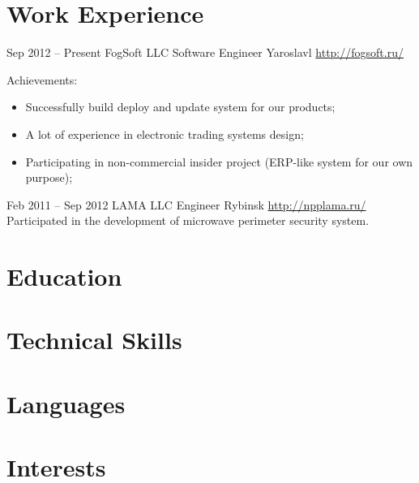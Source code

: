 \documentclass[11pt,a4paper,sans]{moderncv}
\begin{document}
    \makecvtitle
    
    \section{Work Experience}
    \cventry
      {Sep 2012 -- Present}
      {FogSoft LLC}
      {Software Engineer}
      {Yaroslavl}
      {\newline{}\url{http://fogsoft.ru/}}
      {Achievements:%
    \begin{itemize}%
    \item Successfully build deploy and update system for our products;
    \item A lot of experience in electronic trading systems design;
    \item Participating in non-commercial insider project (ERP-like system for our own purpose);
    \end{itemize}}
    \cventry
      {Feb 2011 -- Sep 2012}
      {LAMA LLC}
      {Engineer}
      {Rybinsk}
      {\newline{}\url{http://npplama.ru/}}
      {Participated in the development of microwave perimeter security system.}
      
    \section{Education}
    
    \section{Technical Skills}
    
    \section{Languages}
    
    \section{Interests}
    
\end{document}
